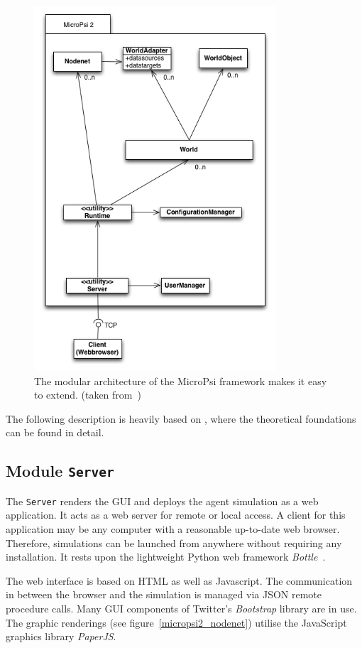 \begin{figure}[h]
  \centering
    \includegraphics[width=9cm]{graphics/UML_MicroPsi_v12}
  \caption{The modular architecture of the MicroPsi framework makes it easy to extend. (taken from~\cite{conf/agi/Bach12})}
  \label{micropsi2_modules}
\end{figure}

The following description is heavily based on \cite{conf/agi/Bach12}, where the theoretical foundations can be found in detail.

        \subsection{Module \texttt{Server}}
The \texttt{Server} renders the GUI and deploys the agent simulation as a web application. It acts as a web server for remote or local access. A client for this application may be any computer with a reasonable up-to-date web browser. Therefore, simulations can be launched from anywhere without requiring any installation. It rests upon the lightweight Python web framework \emph{Bottle}~\cite{bottlepy}.

The web interface is based on HTML as well as Javascript. The communication in between the browser and the simulation is managed via JSON remote procedure calls. Many GUI components of Twitter's \emph{Bootstrap} library are in use. The graphic renderings (see figure~\ref{micropsi2_nodenet}) utilise the JavaScript graphics library \emph{PaperJS}. 

